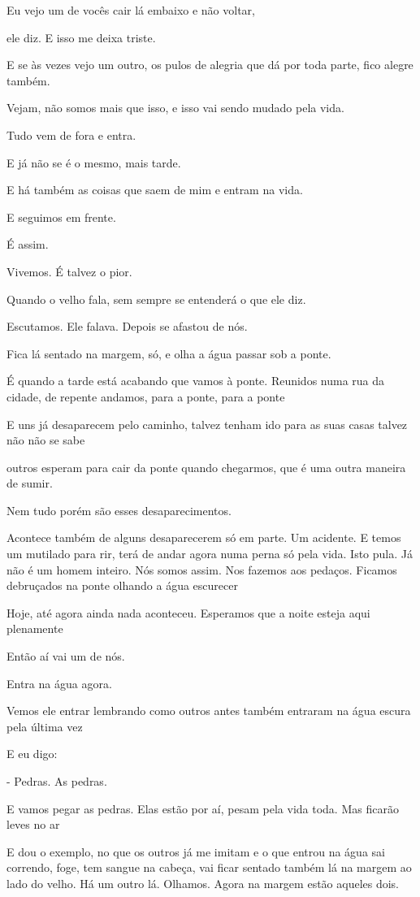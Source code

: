 Eu vejo um de vocês cair lá embaixo e não voltar,

ele diz. E isso me deixa triste.

E se às vezes vejo um outro, os pulos de alegria que dá por toda parte,
fico alegre também.

Vejam, não somos mais que isso, e isso vai sendo mudado pela vida.

Tudo vem de fora e entra.

E já não se é o mesmo, mais tarde.

E há também as coisas que saem de mim e entram na vida.

E seguimos em frente.

É assim.

Vivemos. É talvez o pior.

Quando o velho fala, sem sempre se entenderá o que ele diz.

Escutamos. Ele falava. Depois se afastou de nós.

Fica lá sentado na margem, só, e olha a água passar sob a ponte.

É quando a tarde está acabando que vamos à ponte. Reunidos numa rua da
cidade, de repente andamos, para a ponte, para a ponte

E uns já desaparecem pelo caminho, talvez tenham ido para as suas casas
talvez não não se sabe

outros esperam para cair da ponte quando chegarmos, que é uma outra
maneira de sumir.

Nem tudo porém são esses desaparecimentos.

Acontece também de alguns desaparecerem só em parte. Um acidente. E
temos um mutilado para rir, terá de andar agora numa perna só pela vida.
Isto pula. Já não é um homem inteiro. Nós somos assim. Nos fazemos aos
pedaços. Ficamos debruçados na ponte olhando a água escurecer

Hoje, até agora ainda nada aconteceu. Esperamos que a noite esteja aqui
plenamente

Então aí vai um de nós.

Entra na água agora.

Vemos ele entrar lembrando como outros antes também entraram na água
escura pela última vez

E eu digo:

- Pedras. As pedras.

E vamos pegar as pedras. Elas estão por aí, pesam pela vida toda. Mas
ficarão leves no ar

E dou o exemplo, no que os outros já me imitam e o que entrou na água
sai correndo, foge, tem sangue na cabeça, vai ficar sentado também lá na
margem ao lado do velho. Há um outro lá. Olhamos. Agora na margem estão
aqueles dois.

